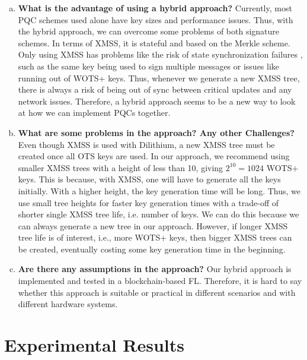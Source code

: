 \begin{enumerate}[a.]
    \item \textbf{What is the advantage of using a hybrid approach?} Currently, most PQC schemes used alone have key sizes and performance issues.
    Thus, with the hybrid approach, we can overcome some problems of both signature schemes.
    In terms of XMSS, it is stateful and based on the Merkle scheme.
    Only using XMSS has problems like the risk of state synchronization failures \cite{mcgrewStateManagementHashBased2016}, such as the same key being used to sign multiple messages or issues like running out of WOTS+ keys.
    Thus, whenever we generate a new XMSS tree, there is always a risk of being out of sync between critical updates and any network issues.
    Therefore, a hybrid approach seems to be a new way to look at how we can implement PQCs together.
    
    \item \textbf{What are some problems in the approach? Any other Challenges?} \\
    Even though XMSS is used with Dilithium, a new XMSS tree must be created once all OTS keys are used.
    In our approach, we recommend using smaller XMSS trees with a height of less than 10, giving $2^10 = 1024$ WOTS+ keys.
    This is because, with XMSS, one will have to generate all the keys initially.
    With a higher height, the key generation time will be long.
    Thus, we use small tree heights for faster key generation times with a trade-off of shorter single XMSS tree life, i.e. number of keys.
    We can do this because we can always generate a new tree in our approach.
    However, if longer XMSS tree life is of interest, i.e., more WOTS+ keys, 
    then bigger XMSS trees can be created, eventually costing some key generation time in the beginning.
    
    \item \textbf{Are there any assumptions in the approach?} Our hybrid approach is implemented and tested in a blockchain-based FL.
    Therefore, it is hard to say whether this approach is suitable or practical in different scenarios and with different hardware systems.
    
\end{enumerate}

\section{Experimental Results} \label{sec-experiment}

